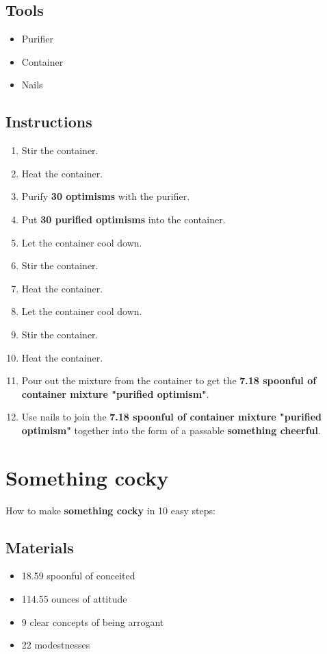 \documentclass{article}
\begin{document}
\subsection{Tools}\begin{itemize}
\item 
Purifier
\item 
Container
\item 
Nails
\end{itemize}
\subsection{Instructions}\begin{enumerate}
\item 
Stir the container.
\item 
Heat the container.
\item 
Purify \textbf{30 optimisms} with the purifier.
\item 
Put \textbf{30 purified optimisms} into the container.
\item 
Let the container cool down.
\item 
Stir the container.
\item 
Heat the container.
\item 
Let the container cool down.
\item 
Stir the container.
\item 
Heat the container.
\item 
Pour out the mixture from the container to get the \textbf{7.18 spoonful of container mixture "purified optimism"}.
\item 
Use nails to join the \textbf{7.18 spoonful of container mixture "purified optimism"} together into the form of a passable \textbf{something cheerful}.
\end{enumerate}
\newpage
\section{Something cocky}How to make \textbf{something cocky} in 10 easy steps:

\subsection{Materials}\begin{itemize}
\item 
18.59 spoonful of conceited
\item 
114.55 ounces of attitude
\item 
9 clear concepts of being arrogant
\item 
22 modestnesses
\end{itemize}
\end{document}
